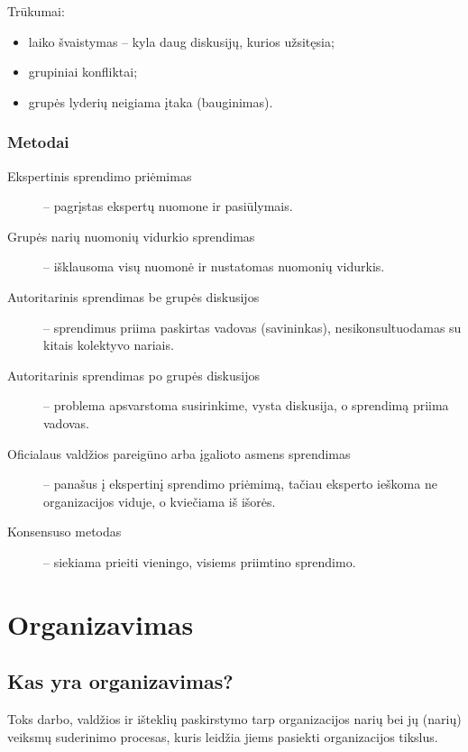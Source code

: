 Trūkumai:
\begin{itemize}
  \item laiko švaistymas – kyla daug diskusijų, kurios užsitęsia;
  \item grupiniai konfliktai;
  \item grupės lyderių neigiama įtaka (bauginimas).
\end{itemize}

\subsection{Metodai}
\begin{description}
  \item[Ekspertinis sprendimo priėmimas] – pagrįstas ekspertų nuomone ir
    pasiūlymais.
  \item[Grupės narių nuomonių vidurkio sprendimas] – išklausoma visų
    nuomonė ir nustatomas nuomonių vidurkis.
  \item[Autoritarinis sprendimas be grupės diskusijos] – sprendimus priima
    paskirtas vadovas (savininkas), nesikonsultuodamas su kitais kolektyvo
    nariais.
  \item[Autoritarinis sprendimas po grupės diskusijos] –  problema
    apsvarstoma susirinkime, vysta diskusija, o sprendimą priima vadovas.
  \item[Oficialaus valdžios pareigūno arba įgalioto asmens sprendimas] –
    panašus į ekspertinį sprendimo priėmimą, tačiau eksperto ieškoma ne
    organizacijos viduje, o kviečiama iš išorės.
  \item[Konsensuso metodas] – siekiama prieiti vieningo, visiems priimtino
    sprendimo.
\end{description}

\chapter{Organizavimas}

\section{Kas yra organizavimas?}

\begin{defn}[Organizavimas]
  Toks darbo, valdžios ir išteklių paskirstymo tarp organizacijos
  narių bei jų (narių) veiksmų suderinimo procesas, kuris leidžia jiems
  pasiekti organizacijos tikslus.
\end{defn}

